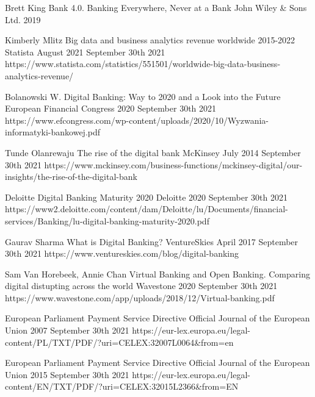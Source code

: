 
\begin{thebibliography}{100}

{Brett King}
{Bank 4.0. Banking Everywhere, Never at a Bank}
{John Wiley \& Sons Ltd.}
{2019}
{}

{Kimberly Mlitz}
{Big data and business analytics revenue worldwide 2015-2022}
{Statista}
{August 2021}
{September 30th 2021}
{https://www.statista.com/statistics/551501/worldwide-big-data-business-analytics-revenue/}

{Bolanowski W.}
{Digital Banking: Way to 2020 and a Look into the Future}
{European Financial Congress}
{2020}
{September 30th 2021}
{https://www.efcongress.com/wp-content/uploads/2020/10/Wyzwania-informatyki-bankowej.pdf}

{Tunde Olanrewaju}
{The rise of the digital bank}
{McKinsey}
{July 2014}
{September 30th 2021}
{https://www.mckinsey.com/business-functions/mckinsey-digital/our-insights/the-rise-of-the-digital-bank}

{Deloitte}
{Digital Banking Maturity 2020}
{Deloitte}
{2020}
{September 30th 2021}
{https://www2.deloitte.com/content/dam/Deloitte/lu/Documents/financial-services/Banking/lu-digital-banking-maturity-2020.pdf}

{Gaurav Sharma}
{What is Digital Banking?}
{VentureSkies}
{April 2017}
{September 30th 2021}
{https://www.ventureskies.com/blog/digital-banking}

{Sam Van Horebeek, Annie Chan}
{Virtual Banking and Open Banking. Comparing digital distupting across the world}
{Wavestone}
{2020}
{September 30th 2021}
{https://www.wavestone.com/app/uploads/2018/12/Virtual-banking.pdf}

{European Parliament}
{Payment Service Directive}
{Official Journal of the European Union }
{2007}
{September 30th 2021}
{https://eur-lex.europa.eu/legal-content/PL/TXT/PDF/?uri=CELEX:32007L0064\&from=en}

{European Parliament}
{Payment Service Directive}
{Official Journal of the European Union}
{2015}
{September 30th 2021}
{https://eur-lex.europa.eu/legal-content/EN/TXT/PDF/?uri=CELEX:32015L2366\&from=EN}


\end{thebibliography}
